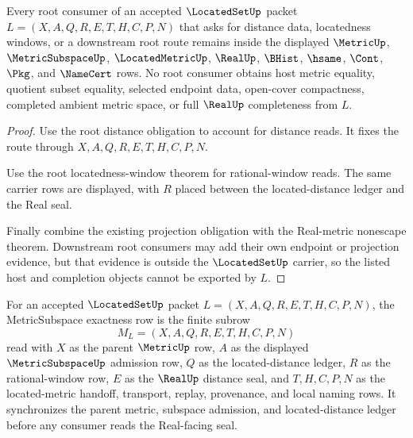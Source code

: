 \begin{theorem}
\label{thm:locatedset-root-nonescape}
Every root consumer of an accepted $\LocatedSetUp$ packet $L=(X,A,Q,R,E,T,H,C,P,N)$ that asks for distance data, locatedness windows, or a downstream root route remains inside the displayed $\MetricUp$, $\MetricSubspaceUp$, $\LocatedMetricUp$, $\RealUp$, $\BHist$, $\hsame$, $\Cont$, $\Pkg$, and $\NameCert$ rows. No root consumer obtains host metric equality, quotient subset equality, selected endpoint data, open-cover compactness, completed ambient metric space, or full $\RealUp$ completeness from $L$.
\end{theorem}
\begin{proof}
Use the root distance obligation to account for distance reads. It fixes the route through $X,A,Q,R,E,T,H,C,P,N$.

Use the root locatedness-window theorem for rational-window reads. The same carrier rows are displayed, with $R$ placed between the located-distance ledger and the Real seal.

Finally combine the existing projection obligation with the Real-metric nonescape theorem. Downstream root consumers may add their own endpoint or projection evidence, but that evidence is outside the $\LocatedSetUp$ carrier, so the listed host and completion objects cannot be exported by $L$.
\end{proof}

\begin{definition}
\label{def:located-set-metric-subspace-exactness-row}
For an accepted $\LocatedSetUp$ packet $L=(X,A,Q,R,E,T,H,C,P,N)$, the MetricSubspace exactness row is the finite subrow
$$
M_L=(X,A,Q,R,E,T,H,C,P,N)
$$
read with $X$ as the parent $\MetricUp$ row, $A$ as the displayed $\MetricSubspaceUp$ admission row, $Q$ as the located-distance ledger, $R$ as the rational-window row, $E$ as the $\RealUp$ distance seal, and $T,H,C,P,N$ as the located-metric handoff, transport, replay, provenance, and local naming rows. It synchronizes the parent metric, subspace admission, and located-distance ledger before any consumer reads the Real-facing seal.
\end{definition}

